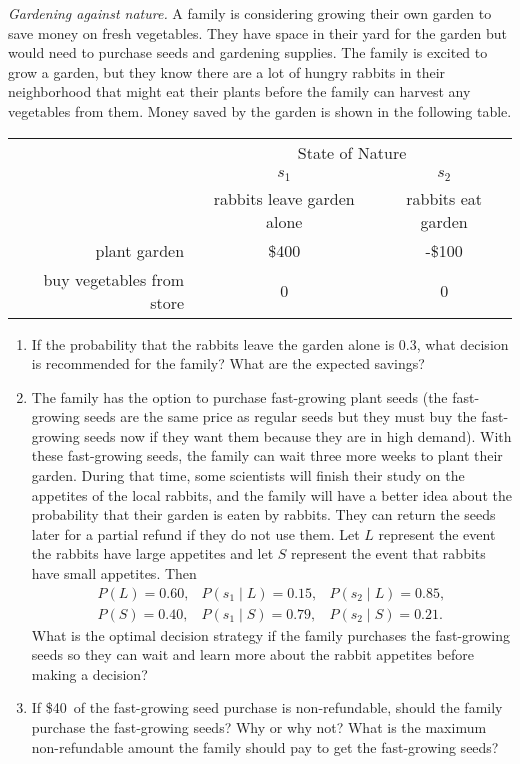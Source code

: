 \item \emph{Gardening against nature.} A family is considering growing
  their own garden to save money on fresh vegetables. They have space
  in their yard for the garden but would need to purchase seeds and
  gardening supplies. The family is excited to grow a garden, but they
  know there are a lot of hungry rabbits in their neighborhood that
  might eat their plants before the family can harvest any vegetables
  from them. Money saved by the garden is shown in the following
  table.

\begin{tabular}{rcc}
& \multicolumn{2}{c}{State of Nature} \\
& $s_1$ & $s_2$ \\
& rabbits leave garden alone & rabbits eat garden \\ \cline{2-3}
plant garden & \$400 & -\$100\\
buy vegetables from store & 0 & 0
\end{tabular}

\begin{enumerate}
    \item If the probability that the rabbits leave the garden alone is 0.3, what decision is recommended for the family? What are the expected savings?
    
    \item The family has the option to purchase fast-growing plant seeds (the fast-growing seeds are the same price as regular seeds but they must buy the fast-growing seeds now if they want them because they are in high demand).  With these fast-growing seeds, the family can wait three more weeks to plant their garden. During that time, some scientists will finish their study on the appetites of the local rabbits, and the family will have a better idea about the probability that their garden is eaten by rabbits. They can return the seeds later for a partial refund if they do not use them.
    Let $L$ represent the event the rabbits have large appetites and let $S$ represent
    the event that rabbits have small appetites. Then
    \[
    \begin{matrix}
    P(L)=0.60, & P(s_1 \mid L)=0.15, & P(s_2 \mid L)=0.85,\\
    P(S)=0.40, & P(s_1 \mid S)=0.79, & P(s_2 \mid S)=0.21.
    \end{matrix}
    \]
    What is the optimal decision strategy if the family purchases the fast-growing seeds so they can wait and learn more about the rabbit appetites before making a decision?
    
    \item If \$40\ of the fast-growing seed purchase is non-refundable, should the family purchase the fast-growing seeds? Why or why not? What is the maximum non-refundable amount the family should pay to get the fast-growing seeds?
\end{enumerate}

